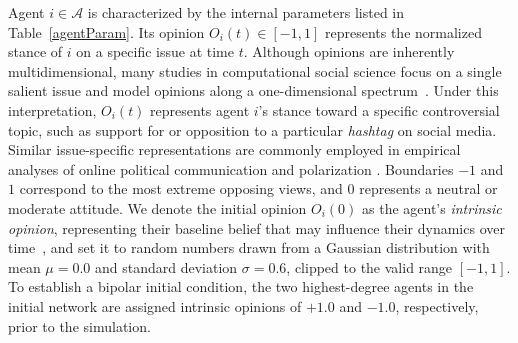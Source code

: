 \documentclass[pdflatex,sn-mathphys-num]{sn-jnl}%
\theoremstyle{thmstyleone}%
\theoremstyle{thmstyletwo}%
\theoremstyle{thmstylethree}%
\def\dgreen#1{\textcolor[rgb]{0.02,0.55,0.04}{#1}}
\def\AgentSet{\mathcal{A}}
\begin{document}
Agent $i \in \AgentSet$ is characterized by the internal parameters listed in Table~\ref{agentParam}. 
Its opinion $O_i(t) \in [-1, 1]$ represents the normalized 
stance of $i$ on a specific issue at time $t$. 
\dgreen{Although opinions are inherently multidimensional, 
many studies in computational social science focus on a 
single salient issue and model opinions along a one-dimensional
spectrum~\cite{Sasahara2021,Uthsav2020}. Under this interpretation, $O_i(t)$
represents agent $i$'s stance toward a specific 
controversial topic, such as support for or 
opposition to a particular \emph{hashtag} on social media. 
Similar issue-specific representations are 
commonly employed in empirical analyses of online 
political communication and polarization \cite{Conover2011,Toriumi2024}.
}
Boundaries $-1$ and $1$ correspond to the most extreme 
opposing views, and $0$ represents a neutral or moderate 
attitude. We denote the initial opinion $O_i(0)$ as 
the agent's \emph{intrinsic opinion}, 
representing their baseline belief that may 
influence their dynamics over time~\cite{Friedkin1990}, 
and set it to random numbers drawn from a Gaussian
distribution with mean $\mu=0.0$ and standard deviation
$\sigma=0.6$, clipped to the valid range $[-1, 1]$.
To establish a bipolar initial condition, the two highest-degree agents in the initial network are assigned intrinsic opinions of $+1.0$ and $-1.0$, respectively, prior to the simulation.
\par
\end{document}

